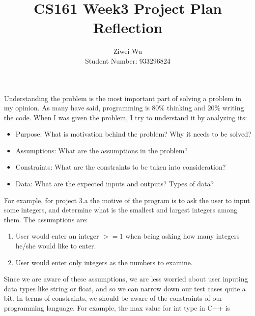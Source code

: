 \documentclass[11pt]{article}
\newenvironment{exercise}[2]{\begin{trivlist}
\item[\hskip \labelsep {\bfseries #1}\hskip \labelsep {\bfseries #2.}]}{\end{trivlist}}
\begin{document}


\title{CS161 Week3 Project Plan Reflection}%
\author{Ziwei Wu\\ %
Student Number: 933296824} %

\maketitle

\begin{exercise}{Understanding}\\
Understanding the problem is the most important part of solving a problem in my
opinion. As many have said, programming is $ 80\% $ thinking and $ 20\% $
writing the code. When I was given the problem, I try to understand it by
analyzing its:
\begin{itemize}
\item  {Purpose}: What is motivation behind the problem? Why it needs
                         to be solved?
\item  {Assumptions}: What are the assumptions in the problem?
\item  {Constraints}: What are the constraints to be taken into consideration?
\item  {Data}: What are the expected inputs and outputs?
                    Types of data?
\end{itemize}
For example, for project 3.a the motive of the program is to ask the user to
input some integers, and determine what is the smallest and largest integers
among them. The assumptions are:
\begin{enumerate}
    \item User would enter an integer $>=1$ when being asking
            how many integers he/she would like to enter.
    \item User would enter only integers as the numbers to examine.
\end{enumerate}
Since we are aware of these assumptions, we are less worried about user
inputing data types like string or float, and so we can narrow down our test
cases quite a bit. In terms of constraints, we should be aware of the constraints of
our programming language. For example, the max value for int type in C++ is

\end{exercise}
\end{document}
